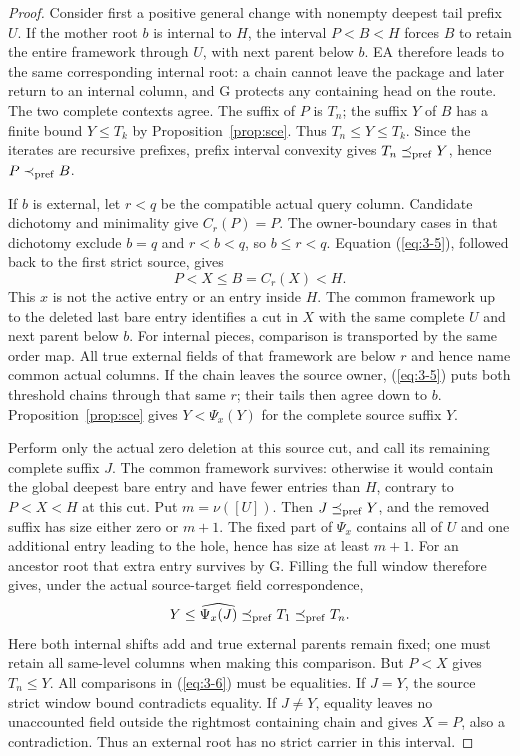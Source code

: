 \begin{proof}
Consider first a positive general change with nonempty deepest tail
prefix $U$. If the mother root $b$ is internal to $H$, the interval
$P<B<H$ forces $B$ to retain the entire framework through $U$, with
next parent below $b$. EA therefore leads to the same corresponding
internal root: a chain cannot leave the package and later return to
an internal column, and G protects any containing head on the route.
The two complete contexts agree. The suffix of $P$ is $T_n$; the suffix
$Y$ of $B$ has a finite bound $Y\le T_k$ by Proposition~\ref{prop:sce}.
Thus $T_n\le Y\le T_k$. Since the iterates are recursive prefixes,
prefix interval convexity gives $T_n\preceq_{\mathrm{pref}} Y$, hence $P\prec_{\mathrm{pref}} B$.

If $b$ is external, let $r<q$ be the compatible actual query column.
Candidate dichotomy and minimality give $C_r(P)=P$. The owner-boundary
cases in that dichotomy exclude $b=q$ and $r<b<q$, so $b\le r<q$.
Equation (\ref{eq:3-5}), followed back to the first strict source, gives
\[
                    P<X\le B=C_r(X)<H.
\]
This $x$ is not the active entry or an entry inside $H$. The common
framework up to the deleted last bare entry identifies a cut in $X$
with the same complete $U$ and next parent below $b$. For internal
pieces, comparison is transported by the same order map. All true
external fields of that framework are below $r$ and hence name common
actual columns. If the chain leaves the source owner, (\ref{eq:3-5}) puts both
threshold chains through that same $r$; their tails then agree down to
$b$. Proposition~\ref{prop:sce} gives $Y<\Psi_x(Y)$ for the complete
source suffix $Y$.

Perform only the actual zero deletion at this source cut, and call its
remaining complete suffix $J$. The common framework survives: otherwise
it would contain the global deepest bare entry and have fewer entries
than $H$, contrary to $P<X<H$ at this cut. Put $m=\nu([U])$.
Then $J\preceq_{\mathrm{pref}} Y$, and the removed suffix has size either zero or $m+1$.
The fixed part of $\Psi_x$ contains all of $U$ and one additional entry
leading to the hole, hence has size at least $m+1$. For an ancestor
root that extra entry survives by G. Filling the full window therefore
gives, under the actual source-target field correspondence,
\begin{equation}\label{eq:3-6}
               Y\le\widehat{\Psi_x(J)}\preceq_{\mathrm{pref}} T_1\preceq_{\mathrm{pref}} T_n.
\end{equation}
Here both internal shifts add and true external parents remain fixed;
one must retain all same-level columns when making this comparison.
But $P<X$ gives $T_n\le Y$. All comparisons in (\ref{eq:3-6}) must be equalities.
If $J=Y$, the source strict window bound contradicts equality. If
$J\ne Y$, equality leaves no unaccounted field outside the rightmost
containing chain and gives $X=P$, also a contradiction. Thus an external
root has no strict carrier in this interval.


\end{proof}
